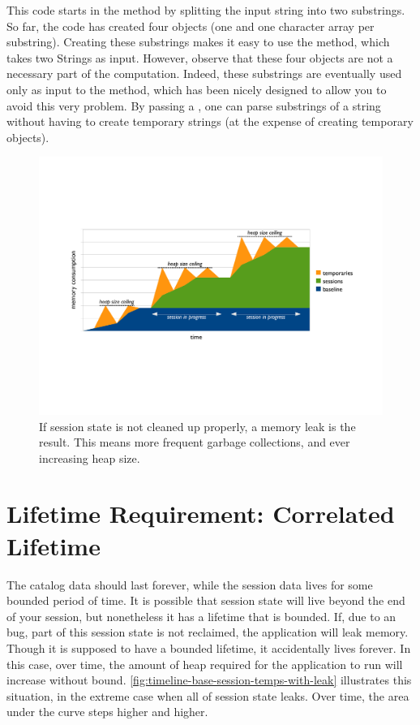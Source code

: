 This code starts in the  method by splitting the input string into two
substrings. So far, the code has created four objects (one  and one
character array per substring). Creating these substrings makes it easy to use
the  method, which takes two Strings as input. However, observe that
these four objects are not a necessary part of the computation. Indeed, these
substrings are eventually used only as input to the 
 method, which has been nicely designed to allow you to avoid this
very problem. By passing a , one can parse substrings of a
string without having to create temporary strings (at the expense of creating
temporary  objects).


\begin{figure}
	\centering
	\includegraphics[width=\textwidth]{part4/Figures/lifetime/timeline-base-session-temps-with-leak}
	\caption{If session state is not cleaned up
	properly, a memory leak is the result. This means more frequent garbage
	collections, and ever increasing heap size.}
	\label{fig:timeline-base-session-temps-with-leak}
\end{figure}

\section{Lifetime Requirement: Correlated Lifetime}
\label{sec:correlated-lifetime}

The catalog data should last forever, while the
session data lives for some bounded period of time. It is possible that session
state will live beyond the end of your session, but nonetheless it has a
lifetime that is bounded. If, due to an bug, part of this session state is not
reclaimed, the application will leak memory. Though it is supposed to have a bounded lifetime, it
accidentally lives forever. In this
case, over time, the amount of heap required for the application to run will increase without bound.
\autoref{fig:timeline-base-session-temps-with-leak} illustrates this situation,
in the extreme case when all of session state leaks. Over time, the area under
the curve steps higher and higher.

